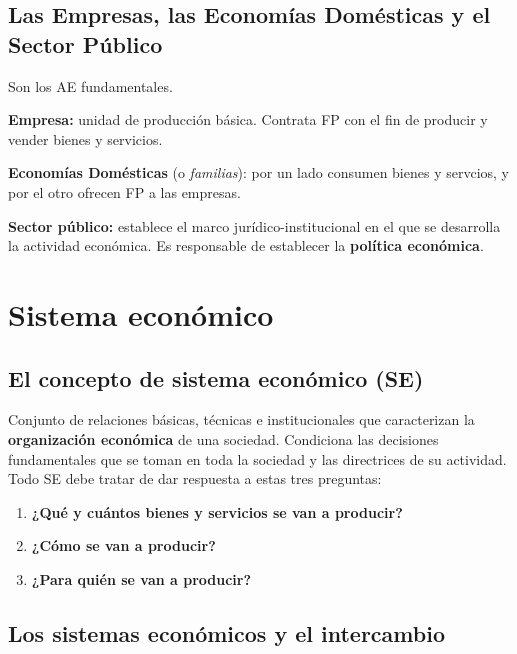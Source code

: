\documentclass[10pt,a4paper]{article}
\begin{document}
\subsection{Las Empresas, las Economías Domésticas y el Sector Público}

Son los AE fundamentales.

\begin{description}
\item \textbf{Empresa:} unidad de producción básica. Contrata FP con el fin de producir y vender bienes y servicios.
\item \textbf{Economías Domésticas} (o \textit{familias}): por un lado consumen bienes y servcios, y por el otro ofrecen FP a las empresas.
\\
\item \textbf{Sector público:} establece el marco jurídico-institucional en el que se desarrolla la actividad económica. Es responsable de establecer la \textbf{política económica}.
\end{description}

\section{Sistema económico }

\subsection{El concepto de sistema económico (SE)}

Conjunto de relaciones básicas, técnicas e institucionales que caracterizan la \textbf{organización económica} de una sociedad. Condiciona las decisiones fundamentales que se toman en toda la sociedad y las directrices de su actividad. Todo SE debe tratar de dar respuesta a estas tres preguntas:

\begin{enumerate}
\item \textbf{¿Qué y cuántos bienes y servicios se van a producir?}
\item \textbf{¿Cómo se van a producir?}
\item \textbf{¿Para quién se van a producir?}
\end{enumerate}

\subsection{Los sistemas económicos y el intercambio}
\end{document}
